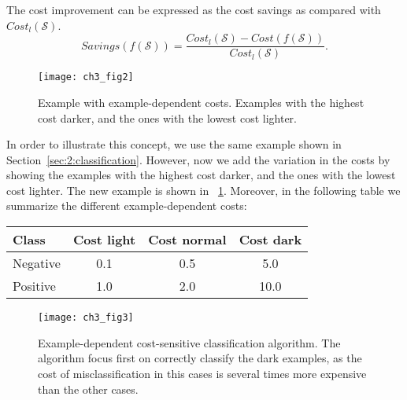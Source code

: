 {{  The cost improvement can be expressed as the cost savings as compared with $Cost_l(\mathcal{S})$. 
  \begin{equation}\label{eq:3:savings}
    Savings(f(\mathcal{S})) = \frac{ Cost_l(\mathcal{S}) - Cost(f(\mathcal{S}))}
    {Cost_l(\mathcal{S})}.
  \end{equation} 

\begin{figure}[t!]
  \centering
  \texttt{[image: ch3\_fig2]}
  \caption{Example with example-dependent costs. Examples with the highest cost darker, and 
the   ones with the lowest cost lighter.}
  \label{fig:3:2}
\end{figure}

In order to illustrate this concept, we use the same example shown in 
Section~\ref{sec:2:classification}. However, now we add the variation in the costs by showing the 
examples with the highest cost darker, and the ones with the lowest cost lighter. The new example 
is shown in \figurename{~\ref{fig:3:2}}. Moreover, in the following table we summarize the 
different example-dependent costs:
  \begin{center}
    \footnotesize
  \begin{tabular}{l|c|c|c}
  Class & Cost light & Cost normal & Cost dark \\
  \hline
    Negative & 0.1 & 0.5 & 5.0 \\
    Positive & 1.0 & 2.0 & 10.0 \\
  \end{tabular}
  \end{center}
  
\begin{figure}[t!]
  \centering
  \texttt{[image: ch3\_fig3]}
  \caption{Example-dependent cost-sensitive classification algorithm. The algorithm focus first on 
correctly classify the dark examples, as the cost of misclassification in this cases is 
several times more expensive than the other cases.}
  \label{fig:3:3}
\end{figure}

}}
